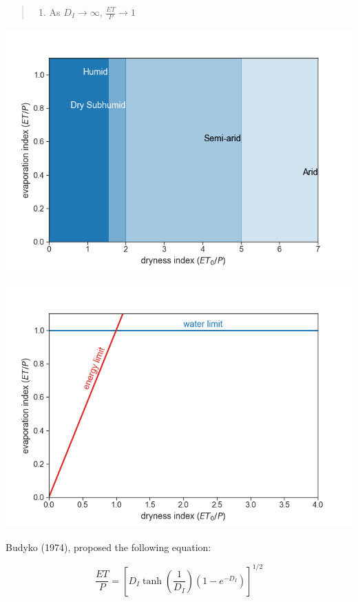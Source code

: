 \documentclass[
  letterpaper,
  DIV=11,
  numbers=noendperiod]{scrreprt}
\providecommand{\tightlist}{%
  \setlength{\itemsep}{0pt}\setlength{\parskip}{0pt}}\usepackage{longtable,booktabs,array}
\begin{document}
\begin{quote}
\begin{enumerate}
\def\labelenumi{(\arabic{enumi})}
\setcounter{enumi}{1}
\tightlist
\item
  As \(D_I\rightarrow \infty\),
  \(\displaystyle\frac{ET}{P}\rightarrow 1\)
\end{enumerate}
\end{quote}

\includegraphics{archive/figures/budyko0.png}

\includegraphics{archive/figures/budyko1.png}

Budyko (1974), proposed the following equation:

\[
\frac{ET}{P} = \left[ D_I \tanh\left( \frac{1}{D_I} \right)\left( 1-e^{-D_I} \right) \right]^{1/2}
\]
\end{document}
